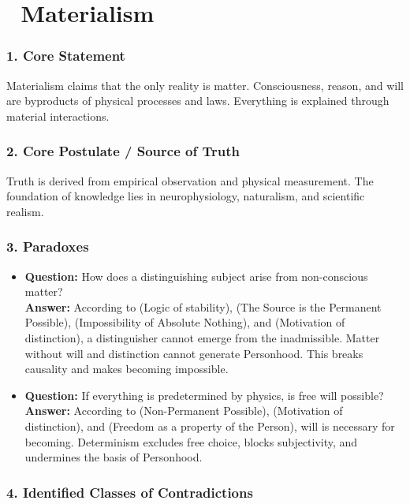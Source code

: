 \documentclass[12pt]{article}
\begin{document}
\section*{🔷 Materialism}

\subsubsection*{1. Core Statement}

Materialism claims that the only reality is matter. Consciousness, reason, and will are byproducts of physical processes and laws. Everything is explained through material interactions.

\subsubsection*{2. Core Postulate / Source of Truth}

Truth is derived from empirical observation and physical measurement. The foundation of knowledge lies in neurophysiology, naturalism, and scientific realism.

\subsubsection*{3. Paradoxes}

\begin{itemize}
\item \textbf{Question:} How does a distinguishing subject arise from non-conscious matter?  
\\ \textbf{Answer:} According to \text{[11.1]} (Logic of stability), \text{[6]} (The Source is the Permanent Possible), \text{[1]} (Impossibility of Absolute Nothing), and \text{[11.4]} (Motivation of distinction), a distinguisher cannot emerge from the inadmissible. Matter without will and distinction cannot generate Personhood. This breaks causality and makes becoming impossible.

\item \textbf{Question:} If everything is predetermined by physics, is free will possible?  
\\ \textbf{Answer:} According to \text{[4.3]} (Non-Permanent Possible), \text{[11.4]} (Motivation of distinction), and \text{[12.2]} (Freedom as a property of the Person), will is necessary for becoming. Determinism excludes free choice, blocks subjectivity, and undermines the basis of Personhood.
\end{itemize}

\subsubsection*{4. Identified Classes of Contradictions}
\end{document}
